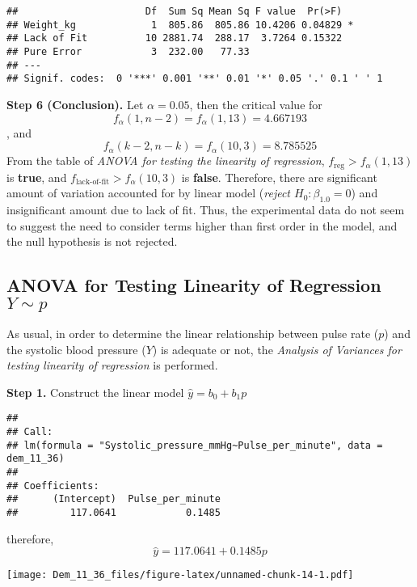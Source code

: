\documentclass[
]{article}
\begin{document}
\begin{verbatim}
##                      Df  Sum Sq Mean Sq F value  Pr(>F)  
## Weight_kg             1  805.86  805.86 10.4206 0.04829 *
## Lack of Fit          10 2881.74  288.17  3.7264 0.15322  
## Pure Error            3  232.00   77.33                  
## ---
## Signif. codes:  0 '***' 0.001 '**' 0.01 '*' 0.05 '.' 0.1 ' ' 1
\end{verbatim}

\textbf{Step 6 (Conclusion).} Let \(\alpha = 0.05\), then the critical
value for \[f_\alpha(1, n-2) = f_\alpha(1, 13) = 4.667193\], and
\[f_\alpha(k-2, n-k) = f_\alpha(10, 3) = 8.785525\] From the table of
\emph{ANOVA for testing the linearity of regression},
\(f_\text{reg} > f_\alpha(1,13)\) is \textbf{true}, and
\(f_\text{lack-of-fit} > f_\alpha(10, 3)\) is \textbf{false}. Therefore,
there are significant amount of variation accounted for by linear model
(\emph{reject \(H_0 : \beta_{1.0} = 0\)}) and insignificant amount due
to lack of fit. Thus, the experimental data do not seem to suggest the
need to consider terms higher than ﬁrst order in the model, and the null
hypothesis is not rejected.

\hypertarget{anova-for-testing-linearity-of-regression-y-sim-p}{%
\subsection{\texorpdfstring{ANOVA for Testing Linearity of Regression
\(Y \sim p\)}{ANOVA for Testing Linearity of Regression Y \textbackslash sim p}}\label{anova-for-testing-linearity-of-regression-y-sim-p}}

As usual, in order to determine the linear relationship between pulse
rate (\(p\)) and the systolic blood pressure (\(Y\)) is adequate or not,
the \emph{Analysis of Variances for testing linearity of regression} is
performed.

\textbf{Step 1.} Construct the linear model \(\hat{y} = b_0 + b_1p\)

\begin{verbatim}
## 
## Call:
## lm(formula = "Systolic_pressure_mmHg~Pulse_per_minute", data = dem_11_36)
## 
## Coefficients:
##      (Intercept)  Pulse_per_minute  
##         117.0641            0.1485
\end{verbatim}

therefore, \[\hat{y} = 117.0641 + 0.1485p\]

\texttt{[image: Dem\_11\_36\_files/figure-latex/unnamed-chunk-14-1.pdf]}
\end{document}
